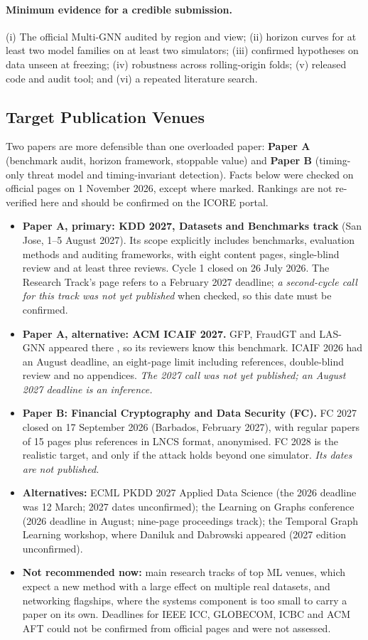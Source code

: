 \documentclass[11pt,a4paper]{article}
\begin{document}
\paragraph{Minimum evidence for a credible submission.} (i) The official Multi-GNN audited by region and view; (ii) horizon curves for at least two model families on at least two simulators; (iii) confirmed hypotheses on data unseen at freezing; (iv) robustness across rolling-origin folds; (v) released code and audit tool; and (vi) a repeated literature search.

\subsection{Target Publication Venues}
Two papers are more defensible than one overloaded paper: \textbf{Paper A} (benchmark audit, horizon framework, stoppable value) and \textbf{Paper B} (timing-only threat model and timing-invariant detection). Facts below were checked on official pages on 1 November 2026, except where marked. Rankings are not re-verified here and should be confirmed on the ICORE portal.
\begin{itemize}[leftmargin=*]
    \item \textbf{Paper A, primary: KDD 2027, Datasets and Benchmarks track} (San Jose, 1--5 August 2027). Its scope explicitly includes benchmarks, evaluation methods and auditing frameworks, with eight content pages, single-blind review and at least three reviews. Cycle 1 closed on 26 July 2026. The Research Track's page refers to a February 2027 deadline; \emph{a second-cycle call for this track was not yet published} when checked, so this date must be confirmed.
    \item \textbf{Paper A, alternative: ACM ICAIF 2027.} GFP, FraudGT and LAS-GNN appeared there \cite{blanusa2024gfp,lin2024fraudgt,verlaan2025lasgnn}, so its reviewers know this benchmark. ICAIF 2026 had an August deadline, an eight-page limit including references, double-blind review and no appendices. \emph{The 2027 call was not yet published; an August 2027 deadline is an inference.}
    \item \textbf{Paper B: Financial Cryptography and Data Security (FC).} FC 2027 closed on 17 September 2026 (Barbados, February 2027), with regular papers of 15 pages plus references in LNCS format, anonymised. FC 2028 is the realistic target, and only if the attack holds beyond one simulator. \emph{Its dates are not published.}
    \item \textbf{Alternatives:} ECML PKDD 2027 Applied Data Science (the 2026 deadline was 12 March; 2027 dates unconfirmed); the Learning on Graphs conference (2026 deadline in August; nine-page proceedings track); the Temporal Graph Learning workshop, where Daniluk and Dabrowski appeared (2027 edition unconfirmed).
    \item \textbf{Not recommended now:} main research tracks of top ML venues, which expect a new method with a large effect on multiple real datasets, and networking flagships, where the systems component is too small to carry a paper on its own. Deadlines for IEEE ICC, GLOBECOM, ICBC and ACM AFT could not be confirmed from official pages and were not assessed.
\end{itemize}
\end{document}
